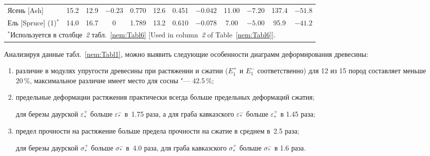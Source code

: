 \begin{table}
\begin{tabular}{p{4cm}|c|c|c|c|c|c|c|c|c|c|c}
Ясень [Ash] & 15.2 & 12.9 & $-0.23$ & 0.770 & 12.6 & 0.451 & $-0.042$ & 11.00 & $-7.20$ & 137.4 & $-51.8$\\

\rule{0mm}{10pt}%

Ель [Spruce] (1)$^*$ & 14.0 & 16.7 & 0 & 1.789 & 13.2 & 0.610 & $-0.078$ & 7.00 & $-5.00$ & 95.9 & $-41.2$\\

\hline

\multicolumn{12}{l}{\rule{0mm}{12pt}%

$^*$Используется в столбце~{\sl 2}  табл.~\ref{nem:Tabl6} [Used in column~{\sl 2} of Table~\ref{nem:Tabl6}]. }

 \end{tabular}

        



\end{table} 





Анализируя данные табл.~\ref{nem:Tabl1}, можно выявить следующие особенности диаграмм деформирования древесины:

\begin{enumerate}

\item 	различие в модулях упругости древесины при растяжении и сжатии ($E_1^+$ и $E_1^-$ соответственно) для 12 из 15 пород составляет меньше 20\,\%, максимальное различие имеет место для сосны "--- 42.5\,\%;

\item предельные деформации растяжения практически всегда больше предельных деформаций сжатия; 

для березы даурской $\varepsilon_*^+$ больше $\varepsilon_*^-$ в~1.75 раза, а для граба кавказского $\varepsilon_*^-$ больше $\varepsilon_*^+$ в 1.45 раза;

\item предел прочности на растяжение больше предела прочности на сжатие в среднем в~2.5 раза; 

для березы даурской $\sigma_*^+$ больше $\sigma_*^-$ в~4.0 раза, для граба кавказского $\sigma_*^+$ больше $\sigma_*^-$ в 1.6 раза.

\end{enumerate}



\smallskip






